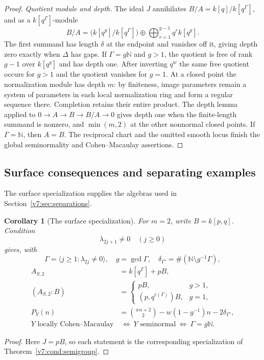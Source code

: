 \documentclass[10pt,fleqn]{article}
\numberwithin{equation}{section}
\newtheorem{corollary}[theorem]{Corollary}
\begin{document}
\begin{proof}
\emph{Quotient module and depth.}
The ideal $J$ annihilates $B/A=k[q]/k[q^\Gamma]$, and as a
$k[q^\Gamma]$-module
\[
 B/A=\bigl(k[q^g]/k[q^\Gamma]\bigr)
       \oplus\bigoplus_{r=1}^{g-1}q^r k[q^g].
\]
The first summand has length $\delta$ at the endpoint and vanishes
off it, giving depth zero exactly when $\Delta$ has gaps.
If $\Gamma=g\mathbb N$ and $g>1$, the quotient is free of rank $g-1$
over $k[q^g]$ and has depth one.  After inverting $q^w$ the same free
quotient occurs for $g>1$ and the quotient vanishes for $g=1$.
At a closed point the normalization module has depth $m$: by finiteness,
image parameters remain a system of parameters in each local
normalization ring and form a regular sequence there.
Completion retains their entire product.  The depth lemma \cite[Tag 00LX]{Stacks}
applied to $0\to A\to B\to B/A\to0$ gives depth one when the
finite-length summand is nonzero, and $\min(m,2)$ at the other
nonnormal closed points.  If $\Gamma=\mathbb N$, then $A=B$.
The reciprocal chart and the omitted smooth locus finish the global
seminormality and Cohen--Macaulay assertions.
\end{proof}

\subsection{Surface consequences and separating examples}
\label{r21:cond:surface-consequences}

The surface specialization supplies the algebras used in
Section~\ref{v7:sec:separations}.

\begin{corollary}[The surface specialization]\label{v6:cond:surface}
For $m=2$, write $B=k[p,q]$.  Condition
\begin{equation}\label{v6:cond:odd-condition}
 \lambda_{2j+1}\ne0\quad(j\ge0)
\end{equation}
gives, with
\begin{equation}\label{v6:cond:semigroup}
 \Gamma=\langle j\ge1:\lambda_{2j}\ne0\rangle,\quad
 g=\gcd\Gamma,\quad\delta_{\Gamma'}=\#(\mathbb N\setminus g^{-1}\Gamma),
\end{equation}
\begin{align}
 A_{S,2}&=k[q^\Gamma]+pB,\label{v6:cond:surface-algebra}\\
 (A_{S,2}:B)&=\begin{cases}pB,&g>1,\\(p,q^{c(\Gamma)})B,&g=1,\end{cases}
 \label{v6:cond:surface-conductor}\\
 P_Y(n)&=\binom{wn+2}{2}-w(1-g^{-1})n-2\delta_{\Gamma'},
 \label{v6:cond:surface-hilbert}\\
 Y\text{ locally Cohen--Macaulay}&\ \Longleftrightarrow\
 Y\text{ seminormal}\ \Longleftrightarrow\ \Gamma=g\mathbb N.
 \label{v6:cond:surface-equivalences}
\end{align}
\end{corollary}
\begin{proof}
Here $J=pB$, so each statement is the corresponding specialization of
Theorem~\ref{v7:cond:semigroup}.
\end{proof}
\end{document}
